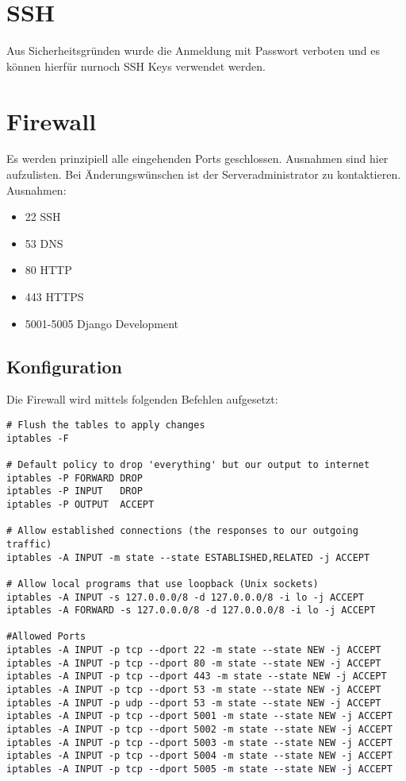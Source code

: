 \documentclass[12pt,a4paper,oneside,ngerman]{scrartcl}
\begin{document}
\section{SSH}
Aus Sicherheitsgründen wurde die Anmeldung mit Passwort verboten und es können hierfür nurnoch SSH Keys verwendet werden.
\newpage

\section{Firewall}
Es werden prinzipiell alle eingehenden Ports geschlossen. Ausnahmen sind hier aufzulisten. Bei Änderungswünschen ist der Serveradministrator zu kontaktieren.\\

Ausnahmen:
\begin{itemize}
\item 22	SSH
\item 53	DNS
\item 80	HTTP
\item 443	HTTPS
\item 5001-5005 Django Development
\end{itemize}

\subsection{Konfiguration}
Die Firewall wird mittels folgenden Befehlen aufgesetzt:
\begin{lstlisting}
# Flush the tables to apply changes
iptables -F

# Default policy to drop 'everything' but our output to internet
iptables -P FORWARD DROP
iptables -P INPUT   DROP
iptables -P OUTPUT  ACCEPT

# Allow established connections (the responses to our outgoing traffic)
iptables -A INPUT -m state --state ESTABLISHED,RELATED -j ACCEPT

# Allow local programs that use loopback (Unix sockets)
iptables -A INPUT -s 127.0.0.0/8 -d 127.0.0.0/8 -i lo -j ACCEPT
iptables -A FORWARD -s 127.0.0.0/8 -d 127.0.0.0/8 -i lo -j ACCEPT

#Allowed Ports
iptables -A INPUT -p tcp --dport 22 -m state --state NEW -j ACCEPT
iptables -A INPUT -p tcp --dport 80 -m state --state NEW -j ACCEPT
iptables -A INPUT -p tcp --dport 443 -m state --state NEW -j ACCEPT
iptables -A INPUT -p tcp --dport 53 -m state --state NEW -j ACCEPT
iptables -A INPUT -p udp --dport 53 -m state --state NEW -j ACCEPT
iptables -A INPUT -p tcp --dport 5001 -m state --state NEW -j ACCEPT
iptables -A INPUT -p tcp --dport 5002 -m state --state NEW -j ACCEPT
iptables -A INPUT -p tcp --dport 5003 -m state --state NEW -j ACCEPT
iptables -A INPUT -p tcp --dport 5004 -m state --state NEW -j ACCEPT
iptables -A INPUT -p tcp --dport 5005 -m state --state NEW -j ACCEPT
\end{lstlisting}
\end{document}

